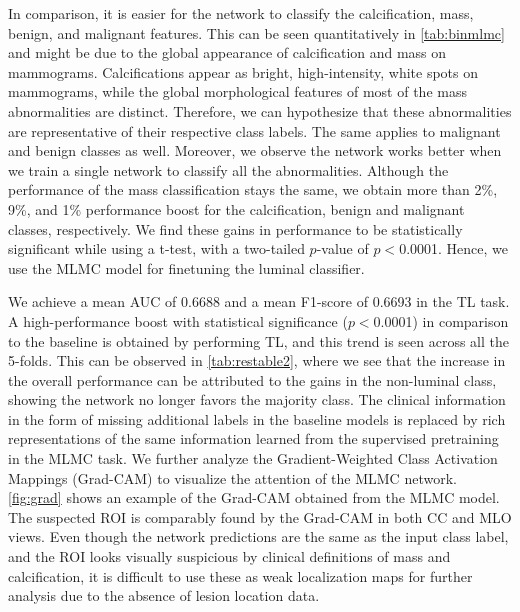 \documentclass{article}
\begin{document}
   







 

In comparison, it is easier for the network to classify the calcification, mass, benign, and malignant features. This can be seen quantitatively in \cref{tab:binmlmc} and might be due to the global appearance of calcification and mass on mammograms. Calcifications appear as bright, high-intensity, white spots on mammograms, while the global morphological features of most of the mass abnormalities are distinct. Therefore, we can hypothesize that these abnormalities are representative of their respective class labels. The same applies to malignant and benign classes as well. Moreover, we observe the network works better when we train a single network to classify all the abnormalities. Although the performance of the mass classification stays the same, we obtain more than 2\%, 9\%, and 1\% performance boost for the calcification, benign and malignant classes, respectively. We find these gains in performance to be statistically significant while using a t-test, with a two-tailed $p$-value of $p$$<$0.0001. Hence, we use the MLMC model for finetuning the luminal classifier.  

We achieve a mean AUC of 0.6688 and a mean F1-score of 0.6693 in the TL task. A high-performance boost with statistical significance ($p$$<$0.0001) in comparison to the baseline is obtained by performing TL, and this trend is seen across all the 5-folds. This can be observed in \cref{tab:restable2}, where we see that the increase in the overall performance can be attributed to the gains in the non-luminal class, showing the network no longer favors the majority class. The clinical information in the form of missing additional labels in the baseline models is replaced by rich representations of the same information learned from the supervised pretraining in the MLMC task. 
We further analyze the Gradient-Weighted Class Activation Mappings (Grad-CAM) to visualize the attention of the MLMC network. \cref{fig:grad} shows an example of the Grad-CAM obtained from the MLMC model. The suspected ROI is comparably found by the Grad-CAM in both CC and MLO views. Even though the network predictions are the same as the input class label, and the ROI looks visually suspicious by clinical definitions of mass and calcification, it is difficult to use these as weak localization maps for further analysis due to the absence of lesion location data. 
\end{document}
